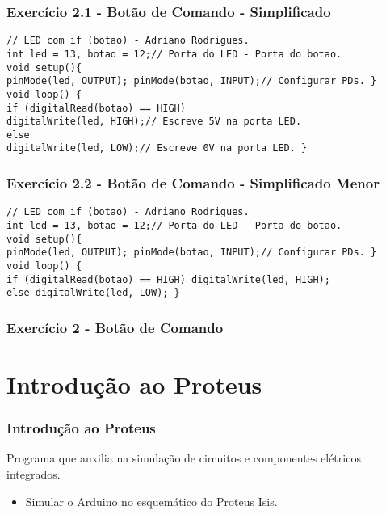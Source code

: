 \documentclass{beamer}
\begin{document}
\begin{frame}[fragile]
	\frametitle{Exercício 2.1 - Botão de Comando - Simplificado}

	\begin{lstlisting}[style=Arduino]
// LED com if (botao) - Adriano Rodrigues.
int led = 13, botao = 12;// Porta do LED - Porta do botao.
void setup(){
pinMode(led, OUTPUT); pinMode(botao, INPUT);// Configurar PDs. }
void loop() {
if (digitalRead(botao) == HIGH)
digitalWrite(led, HIGH);// Escreve 5V na porta LED.
else
digitalWrite(led, LOW);// Escreve 0V na porta LED. }	\end{lstlisting}
\end{frame}

\begin{frame}[fragile]
	\frametitle{Exercício 2.2 - Botão de Comando - Simplificado Menor}

	\begin{lstlisting}[style=Arduino]
// LED com if (botao) - Adriano Rodrigues.
int led = 13, botao = 12;// Porta do LED - Porta do botao.
void setup(){
pinMode(led, OUTPUT); pinMode(botao, INPUT);// Configurar PDs. }
void loop() {
if (digitalRead(botao) == HIGH) digitalWrite(led, HIGH);
else digitalWrite(led, LOW); }	\end{lstlisting}
\end{frame}
\begin{frame}
	\frametitle{Exercício 2 - Botão de Comando}
	\begin{center}
	\end{center}
\end{frame}

\section{Introdução ao Proteus}
\begin{frame}
	\frametitle{Introdução ao Proteus}
	\begin{center}
		 \hspace{50pt}
	\end{center}
	Programa que auxilia na simulação de circuitos e componentes elétricos integrados.\\[5pt]
	\begin{itemize}
	\item Simular o Arduino no esquemático do Proteus Isis.
	\end{itemize}
	\begin{center}
	\end{center}
\end{frame}
\end{document}
